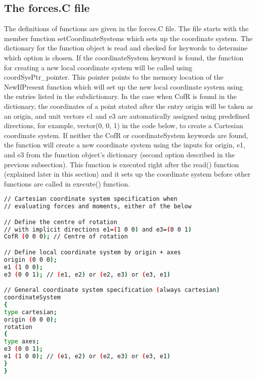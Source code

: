 \subsection{The forces.C file}
The definitions of functions are given in the forces.C file. The file starts with the member function setCoordinateSystems which sets up the coordinate system. The dictionary for the function object is read and checked for keywords to determine which option is chosen. If the coordinateSystem keyword is found, the function for creating a new local coordinate system will be called using coordSysPtr\_pointer. This pointer points to the memory location of the NewIfPresent function which will set up the new local coordinate system using the entries listed in the subdictionary. In the case when CofR is found in the dictionary, the coordinates of a point stated after the entry origin will be taken as an origin, and unit vectors e1 and e3 are automatically assigned using predefined directions, for example, vector(0, 0, 1) in the code below, to create a Cartesian coordinate system. If neither the CofR or coordinateSystem keywords are found, the function will create a new coordinate system using the inputs for origin, e1, and e3 from the function object’s dictionary (second option described in the previous subsection). This function is executed right after the read() function (explained later in this section) and it sets up the coordinate system before other functions are called in execute() function. 

\begin{lstlisting}[language=sh, caption=Coordinate system specification for function object forces]
// Cartesian coordinate system specification when
// evaluating forces and moments, either of the below

// Define the centre of rotation
// with implicit directions e1=(1 0 0) and e3=(0 0 1)
CofR (0 0 0); // Centre of rotation

// Define local coordinate system by origin + axes
origin (0 0 0);
e1 (1 0 0);
e3 (0 0 1); // (e1, e2) or (e2, e3) or (e3, e1)

// General coordinate system specification (always cartesian)
coordinateSystem
{
type cartesian;
origin (0 0 0);
rotation
{
type axes;
e3 (0 0 1);
e1 (1 0 0); // (e1, e2) or (e2, e3) or (e3, e1)
}
}
\end{lstlisting}

